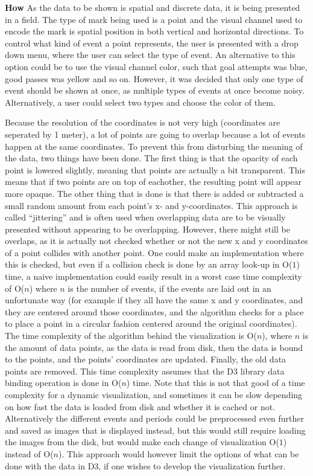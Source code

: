\documentclass[Report.tex]{subfiles}
\begin{document}
\noindent \textbf{How} As the data to be shown is spatial and discrete data, it is being presented in a field. The type of mark being used is a point and the visual channel used to encode the mark is spatial position in both vertical and horizontal directions. To control what kind of event a point represents, the user is presented with a drop down menu, where the user can select the type of event. An alternative to this option could be to use the visual channel color, such that goal attempts was blue, good passes was yellow and so on. However, it was decided that only one type of event should be shown at once, as multiple types of events at once become noisy. Alternatively, a user could select two types and choose the color of them.

Because the resolution of the coordinates is not very high (coordinates are seperated by 1 meter), a lot of points are going to overlap because a lot of events happen at the same coordinates. To prevent this from disturbing the meaning of the data, two things have been done. The first thing is that the opacity of each point is lowered slightly, meaning that points are actually a bit transparent. This means that if two points are on top of eachother, the resulting point will appear more opaque. The other thing that is done is that there is added or subtracted a small random amount from each point's x- and y-coordinates. This approach is called ``jittering'' and is often used when overlapping data are to be visually presented without appearing to be overlapping. However, there might still be overlaps, as it is actually not checked whether or not the new x and y coordinates of a point collides with another point. One could make an implementation where this is checked, but even if a collision check is done by an array look-up in O($1$) time, a naive implementation could easily result in a worst case time complexity of O($n$) where $n$ is the number of events, if the events are laid out in an unfortunate way (for example if they all have the same x and y coordinates, and they are centered around those coordinates, and the algorithm checks for a place to place a point in a circular fashion centered around the original coordinates). The time complexity of the algorithm behind the visualization is O($n$), where $n$ is the amount of data points, as the data is read from disk, then the data is bound to the points, and the points' coordinates are updated. Finally, the old data points are removed. This time complexity assumes that the D3 library data binding operation is done in O($n$) time. Note that this is not that good of a time complexity for a dynamic visualization, and sometimes it can be slow depending on how fast the data is loaded from disk and whether it is cached or not. Alternatively the different events and periods could be preprocessed even further and saved as images that is displayed instead, but this would still require loading the images from the disk, but would make each change of visualization O($1$) instead of O($n$). This approach would however limit the options of what can be done with the data in D3, if one wishes to develop the visualization further.
\end{document}
